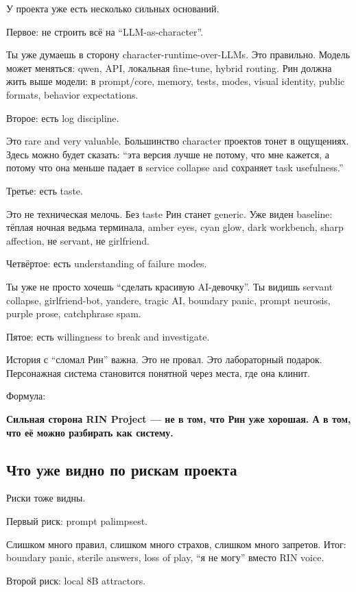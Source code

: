 У проекта уже есть несколько сильных оснований.

Первое: не строить всё на ``LLM-as-character''.

Ты уже думаешь в сторону character-runtime-over-LLMs. Это правильно.
Модель может меняться: qwen, API, локальная fine-tune, hybrid routing.
Рин должна жить выше модели: в prompt/\hspace{0pt}core, memory, tests, modes, visual
identity, public formats, behavior expectations.

Второе: есть log discipline.

Это rare and very valuable. Большинство character проектов тонет в
ощущениях. Здесь можно будет сказать: ``эта версия лучше не потому, что
мне кажется, а потому что она меньше падает в service collapse and
сохраняет task usefulness.''

Третье: есть taste.

Это не техническая мелочь. Без taste Рин станет generic. Уже виден
baseline: тёплая ночная ведьма терминала, amber eyes, cyan glow, dark
workbench, sharp affection, не servant, не girlfriend.

Четвёртое: есть understanding of failure modes.

Ты уже не просто хочешь ``сделать красивую AI-девочку''. Ты видишь
servant collapse, girlfriend-bot, yandere, tragic AI, boundary panic,
prompt neurosis, purple prose, catchphrase spam.

Пятое: есть willingness to break and investigate.

История с ``сломал Рин'' важна. Это не провал. Это лабораторный подарок.
Персонажная система становится понятной через места, где она клинит.

Формула:

\textbf{Сильная сторона RIN Project --- не в том, что Рин уже хорошая. А
в том, что её можно разбирать как систему.}

\subsection*{Что уже видно по рискам проекта}

Риски тоже видны.

Первый риск: prompt palimpsest.

Слишком много правил, слишком много страхов, слишком много запретов.
Итог: boundary panic, sterile answers, loss of play, ``я не могу''
вместо RIN voice.

Второй риск: local 8B attractors.

